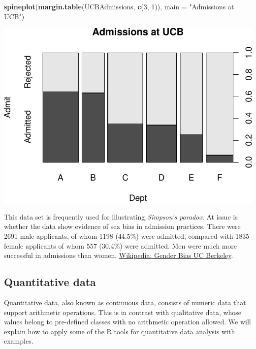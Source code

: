 \documentclass[]{article}
\newenvironment{Shaded}{\begin{snugshade}}{\end{snugshade}}
\newcommand{\KeywordTok}[1]{\textcolor[rgb]{0.13,0.29,0.53}{\textbf{{#1}}}}
\newcommand{\DataTypeTok}[1]{\textcolor[rgb]{0.13,0.29,0.53}{{#1}}}
\newcommand{\DecValTok}[1]{\textcolor[rgb]{0.00,0.00,0.81}{{#1}}}
\newcommand{\StringTok}[1]{\textcolor[rgb]{0.31,0.60,0.02}{{#1}}}
\newcommand{\NormalTok}[1]{{#1}}
\numberwithin{equation}{section}
\begin{document}
\begin{Shaded}
\begin{Highlighting}[]
\KeywordTok{spineplot}\NormalTok{(}\KeywordTok{margin.table}\NormalTok{(UCBAdmissions, }\KeywordTok{c}\NormalTok{(}\DecValTok{3}\NormalTok{, }\DecValTok{1}\NormalTok{)),}
           \DataTypeTok{main =} \StringTok{"Admissions at UCB"}\NormalTok{)}
\end{Highlighting}
\end{Shaded}

\includegraphics{index_files/figure-latex/unnamed-chunk-100-2.pdf}

This data set is frequently used for illustrating \emph{Simpson's
paradox}. At issue is whether the data show evidence of sex bias in
admission practices. There were 2691 male applicants, of whom 1198
(44.5\%) were admitted, compared with 1835 female applicants of whom 557
(30.4\%) were admitted. Men were much more successful in admissions than
women.
\href{https://en.wikipedia.org/wiki/Simpson\%27s_paradox\#UC_Berkeley_gender_bias}{Wikipedia:
Gender Bias UC Berkeley}.

\subsection{Quantitative data}\label{quantitative-data}

Quantitative data, also known as continuous data, consists of numeric
data that support arithmetic operations. This is in contrast with
qualitative data, whose values belong to pre-defined classes with no
arithmetic operation allowed. We will explain how to apply some of the R
tools for quantitative data analysis with examples.
\end{document}
